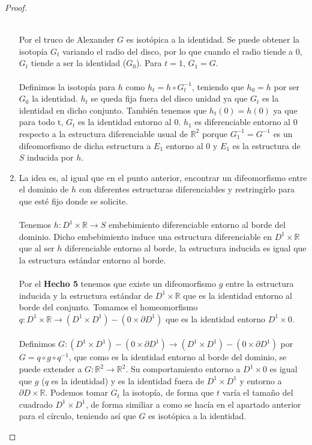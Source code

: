 \begin{proof}
\begin{enumerate}
				\\ Por el truco de Alexander $G$ es isotópica a la identidad. Se puede obtener la isotopía $G_t$ variando el radio del disco, por lo que cuando el radio tiende a $0$, $G_t$ tiende a ser la identidad ($G_0$). Para $t=1$, $G_1=G$.\\
				\\ Definimos la isotopía para $h$ como $h_t=h\circ G_t^{-1}$, teniendo que $h_0=h$ por ser $G_0$ la identidad. $h_t$ se queda fija fuera del disco unidad ya que $G_t$ es la identidad en dicho conjunto. También tenemos que $h_t(0)=h(0)$ ya que para todo t, $G_t$ es la identidad entorno al $0$. $h_1$ es diferenciable entorno al $0$ respecto a la estructura diferenciable usual de $\mathbb{R}^2$ porque $G_1^{-1}=G^{-1}$ es un difeomorfismo de dicha estructura a $E_1$ entorno al $0$ y $E_1$ es la estructura de $S$ inducida por $h$.
			\item La idea es, al igual que en el punto anterior, encontrar un difeomorfismo entre el dominio de $h$ con diferentes estructuras diferenciables y restringirlo para que esté fijo donde se solicite.\\
				\\ Tenemos $h: D^1\times \mathbb{R} \rightarrow S$ embebimiento diferenciable entorno al borde del dominio. Dicho embebimiento induce una estructura diferenciable en $D^1\times \mathbb{R}$ que al ser $h$ diferenciable entorno al borde, la estructura inducida es igual que la estructura estándar entorno al borde.\\
				\\ Por el \textbf{Hecho 5} tenemos que existe un difeomorfismo $g$ entre la estructura inducida y la estructura estándar de $D^1\times \mathbb{R}$ que es la identidad entorno al borde del conjunto. Tomamos el homeomorfismo $q: D^1\times \mathbb{R} \rightarrow (D^1\times D^1) - (0 \times \partial D^1)$ que es la identidad entorno $D^1\times 0$.\\
				\\ Definimos $G:  (D^1\times D^1) - (0 \times \partial D^1) \rightarrow (D^1\times D^1) - (0 \times \partial D^1)$ por $G = q \circ g \circ q^{-1}$, que como es la identidad entorno al borde del dominio, se puede extender a $G:\mathbb{R}^2 \rightarrow \mathbb{R}^2$. Su comportamiento entorno a $D^1 \times 0$ es igual que $g$ ($q$ es la identidad) y es la identidad fuera de $D^1 \times D^1$ y entorno a $\partial D \times \mathbb{R}$. Podemos tomar $G_t$ la isotopía, de forma que $t$ varía el tamaño del cuadrado $D^1 \times D^1$, de forma similiar a como se hacía en el apartado anterior para el círculo, teniendo así que $G$ es isotópica a la identidad.\\

\end{enumerate}
\end{proof}
